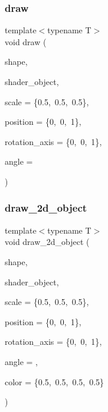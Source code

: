 \subsubsection{\texorpdfstring{draw}{draw}\hspace{0.1cm}{\footnotesize\ttfamily [2/2]}}
{\footnotesize\ttfamily template$<$typename T$>$ \\
void draw (\begin{DoxyParamCaption}\item[{\mbox{\hyperlink{classShape}{Shape}}$<$ T $>$ \&}]{shape,  }\item[{\mbox{\hyperlink{classShader}{Shader}}$<$ \mbox{\hyperlink{render_8hpp_a24e288e18eb7b6e01de7565001fedb60a9d34355b5a26c54b5dbab1e45245a6f4}{R\+E\+N\+D\+E\+R\+\_\+\+T\+Y\+P\+E\+::\+C\+U\+S\+T\+O\+M\+\_\+\+C\+O\+L\+OR}} $>$ \&}]{shader\+\_\+object,  }\item[{std\+::array$<$ float, 3 $>$}]{scale = {\ttfamily \{0.5,~0.5,~0.5\}},  }\item[{std\+::array$<$ float, 3 $>$}]{position = {\ttfamily \{0,~0,~1\}},  }\item[{std\+::array$<$ float, 3 $>$}]{rotation\+\_\+axis = {\ttfamily \{0,~0,~1\}},  }\item[{float}]{angle = {} }\end{DoxyParamCaption})\hspace{0.3cm}{\ttfamily [friend]}}

\mbox{\label{classShape_aaff31c90cf40c78284454009c9fe0966}} 
\subsubsection{\texorpdfstring{draw\+\_\+2d\+\_\+object}{draw\_2d\_object}}
{\footnotesize\ttfamily template$<$typename T$>$ \\
void draw\+\_\+2d\+\_\+object (\begin{DoxyParamCaption}\item[{\mbox{\hyperlink{classShape}{Shape}}$<$ T $>$ \&}]{shape,  }\item[{\mbox{\hyperlink{classShader}{Shader}}$<$ \mbox{\hyperlink{render_8hpp_a24e288e18eb7b6e01de7565001fedb60aa98862073f71a928bad5099cc3e1c2ed}{R\+E\+N\+D\+E\+R\+\_\+\+T\+Y\+P\+E\+::\+U\+N\+I\+F\+O\+R\+M\+\_\+\+C\+O\+L\+OR}} $>$ \&}]{shader\+\_\+object,  }\item[{std\+::array$<$ float, 3 $>$}]{scale = {\ttfamily \{0.5,~0.5,~0.5\}},  }\item[{std\+::array$<$ float, 3 $>$}]{position = {\ttfamily \{0,~0,~1\}},  }\item[{std\+::array$<$ float, 3 $>$}]{rotation\+\_\+axis = {\ttfamily \{0,~0,~1\}},  }\item[{float}]{angle = {},  }\item[{glm\+::vec4}]{color = {\ttfamily \{0.5,~0.5,~0.5,~0.5\}} }\end{DoxyParamCaption})\hspace{0.3cm}{\ttfamily [friend]}}

